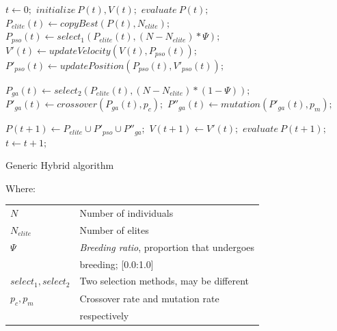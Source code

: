 \documentclass{acm_proc_article-sp}
\begin{document}
\begin{algorithm}[h]
  \begin{algorithmic}
    \STATE $t \gets 0;$
    \STATE $initialize\: P(t), V(t);$
    \STATE $evaluate\: P(t);$
    \REPEAT
      \STATE $P_{elite}(t) \gets copyBest(P(t), N_{elite});$
      \STATE $P_{pso}(t) \gets select_1(P_{elite}(t), (N - N_{elite}) * \Psi);$
      \STATE $V'(t) \gets updateVelocity(V(t), P_{pso}(t));$
      \STATE $P'_{pso}(t) \gets updatePosition(P_{pso}(t), V'_{pso}(t));$
      
      \STATE $P_{ga}(t) \gets select_2(P_{elite}(t), (N - N_{elite}) * (1-\Psi));$
      \STATE $P'_{ga}(t) \gets crossover(P_{ga}(t), p_c);$
      \STATE $P''_{ga}(t) \gets mutation(P'_{ga}(t), p_m);$
      
      \STATE $P(t+1) \gets P_{elite} \cup P'_{pso} \cup P''_{ga};$
      \STATE $V(t+1) \gets V'(t);$
      \STATE $evaluate\: P(t+1);$
      \STATE $t \gets t + 1;$
  \end{algorithmic}
  \caption{Generic Hybrid algorithm}\label{algo:hb}
\end{algorithm}
Where:\\
  \begin{tabular}{ll}
  $ N $ & Number of individuals \\
  $ N_{elite} $ & Number of elites \\
  $ \Psi $ & \emph{Breeding ratio}, proportion that undergoes \\
  & breeding; [0.0:1.0]\\
  $ select_1, select_2 $ & Two selection methods, may be different\\
  $ p_c, p_m $ & Crossover rate and mutation rate \\
  & respectively \\
  \end{tabular}
\end{document}
